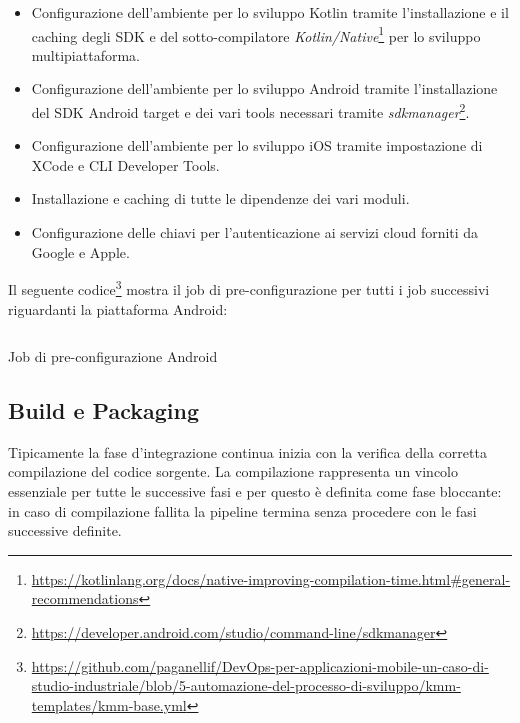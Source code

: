 \begin{itemize}
    \item Configurazione dell'ambiente per lo sviluppo Kotlin tramite l'installazione e il caching degli SDK e del sotto-compilatore \textit{Kotlin/Native}\footnote{\href{https://kotlinlang.org/docs/native-improving-compilation-time.html\#general-recommendations}{https://kotlinlang.org/docs/native-improving-compilation-time.html\#general-recommendations}} per lo sviluppo multipiattaforma.
    
    \item Configurazione dell'ambiente per lo sviluppo Android tramite l'installazione del SDK Android target e dei vari tools necessari tramite \textit{sdkmanager}\footnote{\href{https://developer.android.com/studio/command-line/sdkmanager}{https://developer.android.com/studio/command-line/sdkmanager}}.
    
    \item Configurazione dell'ambiente per lo sviluppo iOS tramite impostazione di XCode e CLI Developer Tools.
    
    \item Installazione e caching di tutte le dipendenze dei vari moduli.
    
    \item Configurazione delle chiavi per l'autenticazione ai servizi cloud forniti da Google e Apple.
\end{itemize}

Il seguente codice\footnote{\href{https://github.com/paganellif/DevOps-per-applicazioni-mobile-un-caso-di-studio-industriale/blob/5-automazione-del-processo-di-sviluppo/kmm-templates/kmm-base.yml}{https://github.com/paganellif/DevOps-per-applicazioni-mobile-un-caso-di-studio-industriale/blob/5-automazione-del-processo-di-sviluppo/kmm-templates/kmm-base.yml}} mostra il job di pre-configurazione per tutti i job successivi riguardanti la piattaforma Android:

\begin{listing}[H]
    \inputminted{yaml}{code/pre-android-job.yaml}
    \caption{Job di pre-configurazione Android}
\end{listing}

\subsection{Build e Packaging}
Tipicamente la fase d'integrazione continua inizia con la verifica della corretta compilazione del codice sorgente.
La compilazione rappresenta un vincolo essenziale per tutte le successive fasi e per questo è definita come fase bloccante: 
in caso di compilazione fallita la pipeline termina senza procedere con le fasi successive definite.


